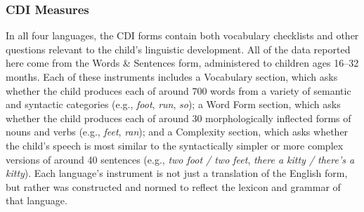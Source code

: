 \documentclass[10pt,letterpaper]{article}
\begin{document}

\subsubsection{CDI Measures}

In all four languages, the CDI forms contain both vocabulary checklists and other questions relevant to the child's linguistic development. All of the data reported here come from the Words \& Sentences form, administered to children ages 16--32 months. Each of these instruments includes a Vocabulary section, which asks whether the child produces each of around 700 words from a variety of semantic and syntactic categories (e.g., \emph{foot}, \emph{run}, \emph{so}); a Word Form section, which asks whether the child produces each of around 30 morphologically inflected forms of nouns and verbs (e.g., \emph{feet}, \emph{ran}); and a Complexity section, which asks whether the child's speech is most similar to the syntactically simpler or more complex versions of around 40 sentences (e.g., \emph{two foot / two feet}, \emph{there a kitty / there's a kitty}). Each language's instrument is not just a translation of the English form, but rather was constructed and normed to reflect the lexicon and grammar of that language. 
\end{document}
